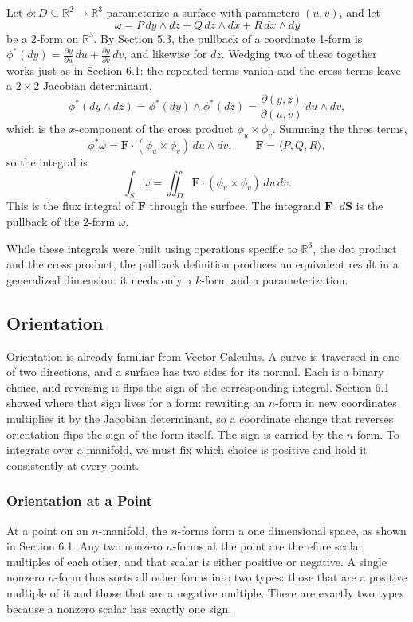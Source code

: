 \documentclass[12pt]{article}
\newcommand{\R}{\mathbb{R}}
\newcommand{\p}{\partial}
\newcommand{\bv}[1]{\mathbf{#1}}
\begin{document}
Let $\phi: D \subseteq \R^2 \to \R^3$ parameterize a surface with parameters $(u,v)$, and let
\[
\omega = P\,dy \wedge dz + Q\,dz \wedge dx + R\,dx \wedge dy
\]
be a 2-form on $\R^3$. By Section 5.3, the pullback of a coordinate 1-form is $\phi^*(dy) = \frac{\p y}{\p u}\,du + \frac{\p y}{\p v}\,dv$, and likewise for $dz$. Wedging two of these together works just as in Section 6.1: the repeated terms vanish and the cross terms leave a $2\times2$ Jacobian determinant,
\[
\phi^*(dy \wedge dz) = \phi^*(dy) \wedge \phi^*(dz) = \frac{\p(y,z)}{\p(u,v)}\,du \wedge dv,
\]
which is the $x$-component of the cross product $\phi_u \times \phi_v$. Summing the three terms,
\[
\phi^*\omega = \bv{F} \cdot (\phi_u \times \phi_v)\,du \wedge dv, \qquad \bv{F} = \langle P, Q, R \rangle,
\]
so the integral is
\[
\int_S \omega = \iint_D \bv{F} \cdot (\phi_u \times \phi_v)\,du\,dv.
\]
This is the flux integral of $\bv{F}$ through the surface. The integrand $\bv{F} \cdot d\bv{S}$ is the pullback of the 2-form $\omega$.

While these integrals were built using operations specific to $\R^3$, the dot product and the cross product, the pullback definition produces an equivalent result in a generalized dimension: it needs only a $k$-form and a parameterization.

\subsection{Orientation}

Orientation is already familiar from Vector Calculus. A curve is traversed in one of two directions, and a surface has two sides for its normal. Each is a binary choice, and reversing it flips the sign of the corresponding integral. Section 6.1 showed where that sign lives for a form: rewriting an $n$-form in new coordinates multiplies it by the Jacobian determinant, so a coordinate change that reverses orientation flips the sign of the form itself. The sign is carried by the $n$-form. To integrate over a manifold, we must fix which choice is positive and hold it consistently at every point.

\subsubsection{Orientation at a Point}

At a point on an $n$-manifold, the $n$-forms form a one dimensional space, as shown in Section 6.1. Any two nonzero $n$-forms at the point are therefore scalar multiples of each other, and that scalar is either positive or negative. A single nonzero $n$-form thus sorts all other forms into two types: those that are a positive multiple of it and those that are a negative multiple. There are exactly two types because a nonzero scalar has exactly one sign.
\end{document}
